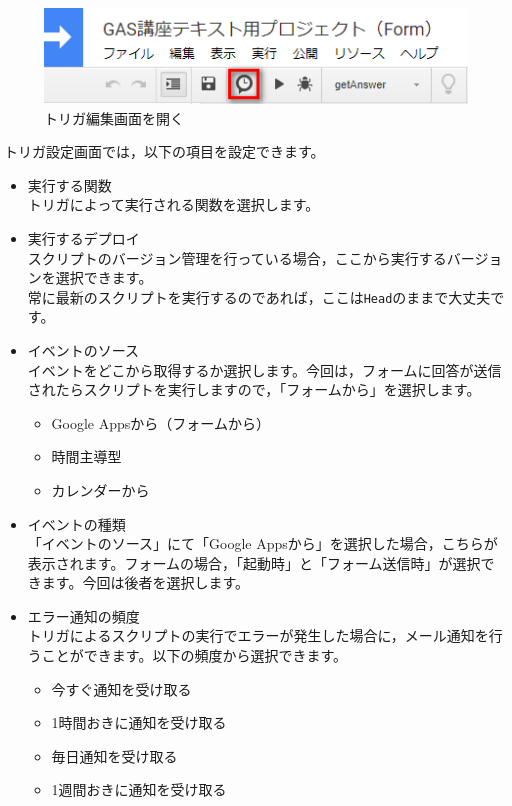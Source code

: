 \documentclass[uplatex,a4j]{jsarticle}
\begin{document}
\begin{figure}[H]
 \centering
 \includegraphics[keepaspectratio, scale=0.7]{images/trigger_button.png}
 \caption{トリガ編集画面を開く}
 \label{fig:trigger_button}
\end{figure}

トリガ設定画面では，以下の項目を設定できます。
\begin{itemize}
\item 実行する関数\\
トリガによって実行される関数を選択します。
\item 実行するデプロイ\\
スクリプトのバージョン管理を行っている場合，ここから実行するバージョンを選択できます。\\
常に最新のスクリプトを実行するのであれば，ここは\verb|Head|のままで大丈夫です。
\item イベントのソース\\
イベントをどこから取得するか選択します。今回は，フォームに回答が送信されたらスクリプトを実行しますので，「フォームから」を選択します。
\begin{itemize}
\item Google Appsから（フォームから）
\item 時間主導型
\item カレンダーから
\end{itemize}
\item イベントの種類\\
「イベントのソース」にて「Google Appsから」を選択した場合，こちらが表示されます。フォームの場合，「起動時」と「フォーム送信時」が選択できます。今回は後者を選択します。
\item エラー通知の頻度\\
トリガによるスクリプトの実行でエラーが発生した場合に，メール通知を行うことができます。以下の頻度から選択できます。
\begin{itemize}
\item 今すぐ通知を受け取る
\item 1時間おきに通知を受け取る
\item 毎日通知を受け取る
\item 1週間おきに通知を受け取る
\end{itemize}
\end{itemize}
\end{document}
